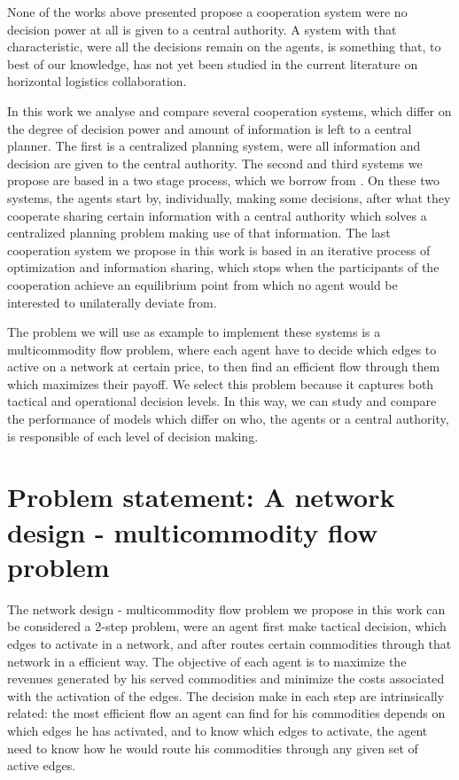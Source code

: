 \documentclass[authoryear]{elsarticle}
\begin{document}
None of the works above presented propose a cooperation system were no decision power at all is given to a central authority. A system with that characteristic, were all the decisions remain on the agents, is something that, to best of our knowledge, has not yet been studied in the current literature on horizontal logistics collaboration.


In this work we analyse and compare several cooperation systems, which differ on the degree of decision power and amount of information is left to a central planner. The first is a centralized planning system, were all information and decision are given to the central authority. The second and third systems we propose are based in a two stage process, which we borrow from \cite{ANUPINDI2001}. On these two systems, the agents start by, individually, making some decisions, after what they cooperate sharing certain information with a central authority which solves a centralized planning problem making use of that information. The last cooperation system we propose in this work is based in an iterative process of optimization and information sharing, which stops when the participants of the cooperation achieve an equilibrium point from which no agent would be interested to unilaterally deviate from. 

The problem we will use as example to implement these systems is a multicommodity flow problem, where each agent have to decide which edges to active on a network at certain price, to then find an efficient flow through them which maximizes their payoff. We select this problem because it captures both tactical and operational decision levels. In this way, we can study and compare the performance of models which differ on who, the agents or a central authority, is responsible of each level of decision making.

\section{Problem statement: A network design - multicommodity flow problem}\label{seq:probdefinition} 

The network design - multicommodity flow problem we propose in this work can be considered a 2-step problem, were an agent first make tactical decision, which edges to activate in a network, and after routes certain commodities through that network in a efficient way.
The objective of each agent is to maximize the revenues generated by his served commodities and minimize the costs associated with the activation of the edges.
The decision make in each step are intrinsically related: the most efficient flow an agent can find for his commodities depends on which edges he has activated, and to know which edges to activate, the agent need to know how he would route his commodities through any given set of active edges. 
\end{document}
